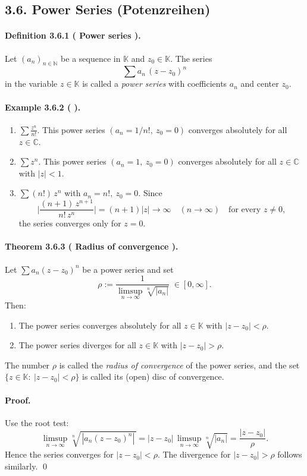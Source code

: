 \documentclass[12pt]{article}
\newcommand{\N}{\mathbb{N}}
\newcommand{\C}{\mathbb{C}}
\newcommand{\K}{\mathbb{K}} %
\newcommand{\NumberedDefinition}[3]{%
\paragraph*{Definition #1 ( #2 ).} #3\par}
\newcommand{\NumberedTheorem}[3]{%
\paragraph*{Theorem #1 ( #2 ).} #3\par}
\newcommand{\NumberedExample}[3]{%
\paragraph*{Example #1 ( #2 ).} #3\par}
\begin{document}
\subsection*{3.6. Power Series (Potenzreihen)}

\NumberedDefinition{3.6.1}{Power series}{Let $(a_n)_{n\in\N}$ be a sequence in $\K$ and $z_0\in\K$. The series
\[
	\sum a_n\,(z-z_0)^{n}
\]
in the variable $z\in\K$ is called a \emph{power series} with coefficients $a_n$ and center $z_0$.}

\NumberedExample{3.6.2}{}{
\begin{enumerate}[label={(\arabic*)}, leftmargin=*]
	\item $\displaystyle \sum \frac{z^{n}}{n!}$. This power series $(a_n=1/n!,\ z_0=0)$ converges absolutely for all $z\in\C$.
	\item $\displaystyle \sum z^{n}$. This power series $(a_n=1,\ z_0=0)$ converges absolutely for all $z\in\C$ with $|z|<1$.
	\item $\displaystyle \sum (n!)\, z^{n}$ with $a_n=n!,\ z_0=0$. Since
	\[
		\Bigg|\frac{(n+1)\,z^{n+1}}{n!\,z^{n}}\Bigg| = (n+1)|z| \longrightarrow \infty \quad (n\to\infty) \quad \text{for every } z\ne0,
	\]
	the series converges only for $z=0$.
\end{enumerate}}

\NumberedTheorem{3.6.3}{Radius of convergence}{Let $\sum a_n (z-z_0)^n$ be a power series and set
\[
	\rho := \frac{1}{\displaystyle \limsup_{n\to\infty} \sqrt[n]{|a_n|}}\;\in [0,\infty].
\]
Then:
\begin{enumerate}[label={(\arabic*)}, leftmargin=*]
	\item The power series converges absolutely for all $z\in\K$ with $|z-z_0|<\rho$.
	\item The power series diverges for all $z\in\K$ with $|z-z_0|>\rho$.
\end{enumerate}}
The number $\rho$ is called the \emph{radius of convergence} of the power series, and the set $\{z\in\K:\ |z-z_0|<\rho\}$ is called its (open) disc of convergence.

\paragraph{Proof.}
Use the root test:
\[
	\limsup_{n\to\infty} \sqrt[n]{\,|a_n (z-z_0)^n|\,}
	 = |z-z_0|\, \limsup_{n\to\infty} \sqrt[n]{|a_n|}
	 = \frac{|z-z_0|}{\rho}.
\]
Hence the series converges for $|z-z_0|<\rho$. The divergence for $|z-z_0|>\rho$ follows similarly. \qed
\end{document}
